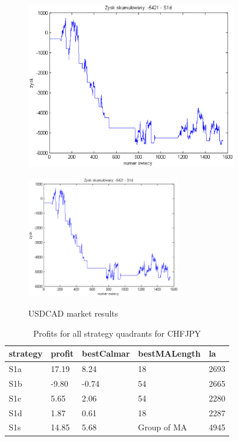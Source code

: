 \documentclass{tewiart}
\begin{document}
\begin{figure}[h]
\begin{minipage}{.49\linewidth}
\label{cztero}
\end{minipage}
\begin{minipage}{.49\linewidth}
\centering
\includegraphics[width=0.82\textwidth]{images/usdcadS1d.eps}
\label{mansard}
\end{minipage}
\begin{minipage}{\linewidth}
\centering
\includegraphics[width=0.6\textwidth]{images/usdcadS1s.eps}
\label{mansard}
\end{minipage}
\caption{USDCAD market results}
\end{figure}
\FloatBarrier
\newpage
\begin{table}[!t]
\caption{Profits for all strategy quadrants for CHFJPY}
 \begin{center}
 \begin{tabular}{|l|l|l|l|l|}
 \hline \textbf{strategy} & \textbf{profit} & \textbf{bestCalmar} & \textbf{bestMALength} & \textbf{la} \\ \hline
S1a & 17.19 & 8.24 & 18 & 2693\\ \hline
S1b & -9.80 & -0.74 & 54 & 2665\\ \hline
S1c & 5.65 & 2.06 & 54 & 2280\\ \hline
S1d & 1.87 & 0.61 & 18 & 2287\\ \hline
S1s & 14.85 & 5.68 & Group of MA & 4945\\
\hline \end{tabular}
 \end{center}
 \end{table}
\end{document}
